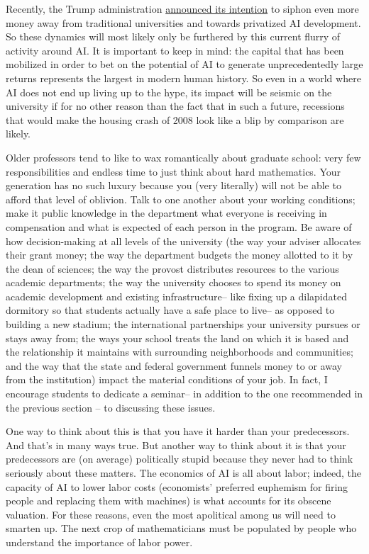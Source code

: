\documentclass[11pt,reqno]{amsart}
\theoremstyle{plain}
\theoremstyle{definition}
\numberwithin{equation}{section}
\numberwithin{theorem}{section}
\begin{document}
Recently, the Trump administration \href{https://www.whitehouse.gov/releases/2026/07/45502/}{announced its intention} to siphon even more money away from traditional universities and towards privatized AI development. So these dynamics will most likely only be furthered by this current flurry of activity around AI. It is important to keep in mind: the capital that has been mobilized in order to bet on the potential of AI to generate unprecedentedly large returns represents the largest in modern human history. So even in a world where AI does not end up living up to the hype, its impact will be seismic on the university if for no other reason than the fact that in such a future, recessions that would make the housing crash of 2008 look like a blip by comparison are likely. 

Older professors tend to like to wax romantically about graduate school: very few responsibilities and endless time to just think about hard mathematics. Your generation has no such luxury because you (very literally) will not be able to afford that level of oblivion. Talk to one another about your working conditions; make it public knowledge in the department what everyone is receiving in compensation and what is expected of each person in the program. Be aware of how decision-making at all levels of the university (the way your adviser allocates their grant money; the way the department budgets the money allotted to it by the dean of sciences; the way the provost distributes resources to the various academic departments; the way the university chooses to spend its money on academic development and existing infrastructure– like fixing up a dilapidated dormitory so that students actually have a safe place to live– as opposed to building a new stadium; the international partnerships your university pursues or stays away from; the ways your school treats the land on which it is based and the relationship it maintains with surrounding neighborhoods and communities; and the way that the state and federal government funnels money to or away from the institution) impact the material conditions of your job. In fact, I encourage students to dedicate a seminar– in addition to the one recommended in the previous section – to discussing these issues. 

One way to think about this is that you have it harder than your predecessors. And that’s in many ways true. But another way to think about it is that your predecessors are (on average) politically stupid because they never had to think seriously about these matters. The economics of AI is all about labor; indeed, the capacity of AI to lower labor costs (economists’ preferred euphemism for firing people and replacing them with machines) is what accounts for its obscene valuation. For these reasons, even the most apolitical among us will need to smarten up. The next crop of mathematicians must be populated by people who understand the importance of labor power. 
\end{document}
